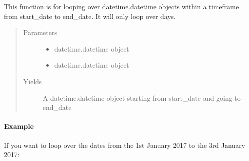 \documentclass[letterpaper,10pt,english]{sphinxmanual}
\begin{document}
\begin{fulllineitems}
\label{\detokenize{generated/MPPy.tools.tools.daterange:MPPy.tools.tools.daterange}}
This function is for looping over datetime.datetime objects within a timeframe from start\_date to end\_date.
It will only loop over days.
\begin{quote}\begin{description}
\item[{Parameters}] \leavevmode\begin{itemize}
\item {} 
 \textendash{} datetime.datetime object

\item {} 
 \textendash{} datetime.datetime object

\end{itemize}

\item[{Yields}] \leavevmode
A datetime.datetime object starting from start\_date and going to end\_date

\end{description}\end{quote}
\paragraph{Example}

If you want to loop over the dates from the 1st January 2017 to the 3rd January 2017:

\begin{sphinxVerbatim}[commandchars=\\\{\}]
  
  
   
    
\end{sphinxVerbatim}

\end{fulllineitems}
\end{document}
